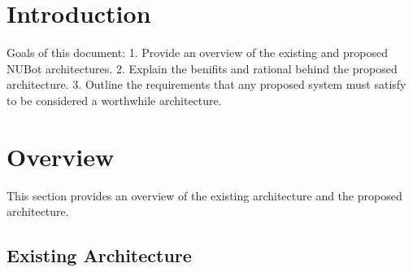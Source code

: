 \documentclass[english,12pt]{scrartcl}
\begin{document}
	\section{Introduction}
		Goals of this document:
		1. Provide an overview of the existing and proposed NUBot architectures.
		2. Explain the benifits and rational behind the proposed architecture.
		3. Outline the requirements that any proposed system must satisfy to be considered a worthwhile architecture.

	\section{Overview}
		This section provides an overview of the existing architecture and the proposed architecture.

		\subsection{Existing Architecture}

\end{document}

